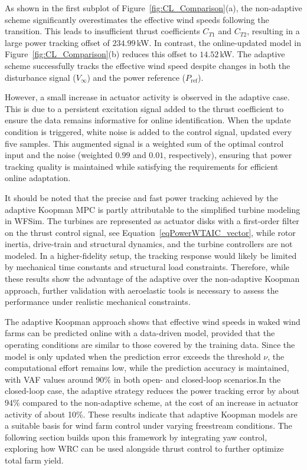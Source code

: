 As shown in the first subplot of Figure~\ref{fig:CL_Comparison}(a), the non-adaptive scheme significantly overestimates the effective wind speeds following the transition. This leads to insufficient thrust coefficients $C_{T1}$ and $C_{T2}$, resulting in a large power tracking offset of $234.99$\,kW. In contrast, the online-updated model in Figure~\ref{fig:CL_Comparison}(b) reduces this offset to $14.52$\,kW. The adaptive scheme successfully tracks the effective wind speed despite changes in both the disturbance signal ($V_{\infty}$) and the power reference ($P_{\text{ref}}$).

However, a small increase in actuator activity is observed in the adaptive case. This is due to a persistent excitation signal added to the thrust coefficient to ensure the data remains informative for online identification. When the update condition is triggered, white noise is added to the control signal, updated every five samples. This augmented signal is a weighted sum of the optimal control input and the noise (weighted $0.99$ and $0.01$, respectively), ensuring that power tracking quality is maintained while satisfying the requirements for efficient online adaptation.

It should be noted that the precise and fast power tracking achieved by the adaptive Koopman MPC is partly attributable to the simplified turbine modeling in WFSim. The turbines are represented as actuator disks with a first-order filter on the thrust control signal, see Equation~\eqref{eqPowerWTAIC_vector}, while rotor inertia, drive-train and structural dynamics, and the turbine controllers are not modeled. In a higher-fidelity setup, the tracking response would likely be limited by mechanical time constants and structural load constraints. Therefore, while these results show the advantage of the adaptive over the non-adaptive Koopman approach, further validation with aeroelastic tools is necessary to assess the performance under realistic mechanical constraints.

The adaptive Koopman approach shows that effective wind speeds in waked wind farms can be predicted online with a data-driven model, provided that the operating conditions are similar to those covered by the training data. Since the model is only updated when the prediction error exceeds the threshold $\nu$, the computational effort remains low, while the prediction accuracy is maintained, with VAF values around 90\%  in both open- and closed-loop scenarios.In the closed-loop case, the adaptive strategy reduces the power tracking error by about 94\% compared to the non-adaptive scheme, at the cost of an increase in actuator activity of about 10\%. These results indicate that adaptive Koopman models are a suitable basis for wind farm control under varying freestream conditions. The following section builds upon this framework by integrating yaw control, exploring how WRC can be used alongside thrust control to further optimize total farm yield.



